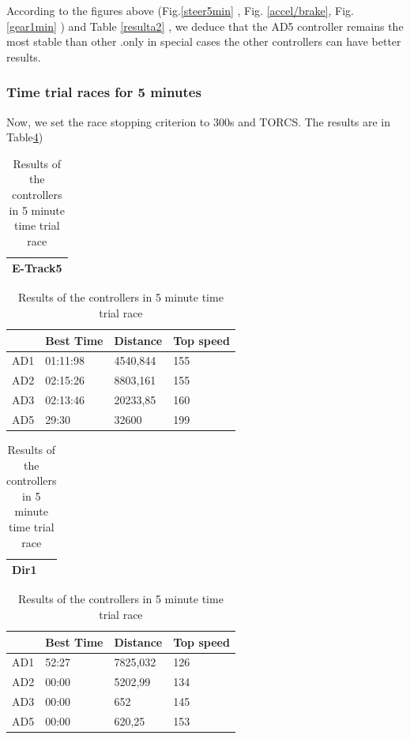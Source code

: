 \documentclass{llncs}
\begin{document}
According to the figures above (Fig.\ref{steer5min} , Fig. \ref{accel/brake}, Fig. \ref{gear1min} ) and Table \ref{resulta2} , we deduce that the AD5 controller remains the most stable than other .only in special cases the other controllers can have better results.

\newpage
\subsubsection{Time trial races for 5 minutes}
Now, we set the race stopping criterion to 300s and TORCS. The results are in Table\ref{resulta9})


\begin{table} [h!] 
	
	\caption{Results of the controllers in 5 minute time trial race}
	\label{resulta9}
	\begin{tabular}{ |p{}|}
		\hline
		\textbf{E-Track5}   
		\\
		\hline
	\end{tabular}
	\begin{tabular}{ ||p{3cm}||p{3cm}||p{3cm}||p{3 cm}||}
		\hline
		{ \color{blue}\textbf{} }&
		{ \color{red}\textbf{Best Time} }&
		{ \color{red} \textbf{Distance } } &
		{ \color{red} \textbf{Top speed} }
		\\
		\hline
		AD1 &01:11:98  &4540,844&  155
		\\
		\hline
		AD2 & 02:15:26 &8803,161& 155
		\\
		\hline
		AD3 & 02:13:46 &20233,85 & 160 
		\\
		\hline 
		AD5 & 29:30&32600&199 
		\\
		\hline 
		
	\end{tabular}
	\begin{tabular}{ |p{}|}
		\hline
		\textbf{Dir1}   
		\\
		\hline
	\end{tabular}
	\begin{tabular}{ ||p{3cm}||p{3cm}||p{3cm}||p{3 cm}||}
		\hline
		{ \color{blue}\textbf{} }&
		{ \color{red}\textbf{Best Time} }&
		{ \color{red} \textbf{Distance } } &
		{ \color{red} \textbf{Top speed} }
		\\
		\hline
		AD1 & 52:27 & 7825,032&126  
		\\
		\hline
		AD2 & 00:00 &5202,99& 134
		\\
		\hline
		AD3 & 00:00 & 652& 145
		\\
		\hline 
		AD5 & 00:00 &620,25& 153 
		\\
		\hline 
		

\end{tabular}
\end{table}
\end{document}
